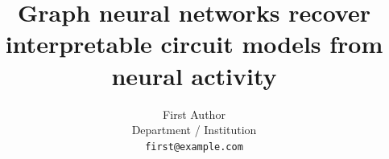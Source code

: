 \documentclass{article}
\title{Graph neural networks recover interpretable circuit models from neural activity}
\author{%
  First Author \\
  Department / Institution \\
  \texttt{first@example.com} \\
}
\begin{document}
\maketitle


\begin{abstract}






\end{abstract}
\end{document}

